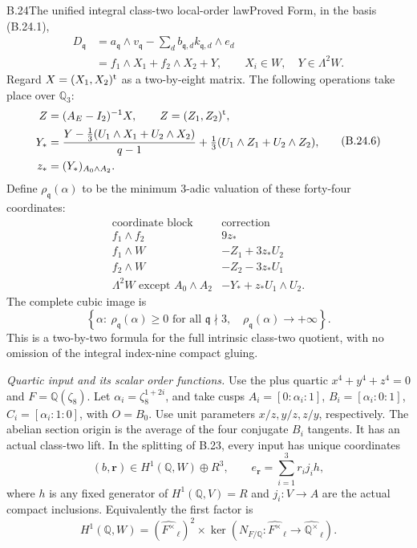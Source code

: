 \begin{statement}{B.24}{The unified integral class-two local-order law}{Proved}
Form, in the basis (B.24.1),
\[
 \begin{split}
 D_{\mathfrak q}
 &=a_{\mathfrak q}\wedge v_{\mathfrak q}
       -\sum_d b_{\mathfrak q,d} k_{\mathfrak q,d}\wedge e_d\\
 &=f_1\wedge X_1+f_2\wedge X_2+Y,
       \qquad X_i\in W,\quad Y\in\Lambda^2W .
 \end{split}                                                    \tag{B.24.5}
\]
Regard $X=(X_1,X_2)^{\rm t}$ as a two-by-eight matrix.
The following operations take place over $\mathbb Q_3$:
\[
 \begin{split}
 Z&=(A_E-I_2)^{-1}X,\qquad Z=(Z_1,Z_2)^{\rm t},\\
 Y_*&=\frac{Y-\tfrac13(U_1\wedge X_1+U_2\wedge X_2)}{q-1}
          +\tfrac13(U_1\wedge Z_1+U_2\wedge Z_2),\\
 z_*&=(Y_*)_{A_0\wedge A_2}.
 \end{split}                                                    \tag{B.24.6}
\]
Define $\rho_{\mathfrak q}(\alpha)$ to be the minimum
$3$-adic valuation of these forty-four coordinates:
\[
 \begin{array}{c|c}
 \text{coordinate block}&\text{correction}\\ \hline
 f_1\wedge f_2&9z_*\\
 f_1\wedge W&-Z_1+3z_*U_2\\
 f_2\wedge W&-Z_2-3z_*U_1\\
 \Lambda^2W\text{ except }A_0\wedge A_2&
                   -Y_*+z_*U_1\wedge U_2 .
 \end{array}                                                    \tag{B.24.7}
\]
The complete cubic image is
\[
 \left\{\alpha:\ 
   \rho_{\mathfrak q}(\alpha)\geq0\text{ for all }\mathfrak q\nmid3,
   \quad \rho_{\mathfrak q}(\alpha)\longrightarrow+\infty\right\}.
                                                               \tag{B.24.8}
\]
This is a two-by-two formula for the full intrinsic
class-two quotient, with no omission of the integral
index-nine compact gluing.

\emph{Quartic input and its scalar order functions.}
Use the plus quartic $x^4+y^4+z^4=0$ and
$F=\mathbb Q(\zeta_8)$. Let $\alpha_i=\zeta_8^{1+2i}$,
and take cusps
$A_i=[0:\alpha_i:1]$, $B_i=[\alpha_i:0:1]$,
$C_i=[\alpha_i:1:0]$, with $O=B_0$.
Use unit parameters $x/z,y/z,z/y$, respectively.
The abelian section origin is the average of the four
conjugate $B_i$ tangents. It has an actual class-two lift.
In the splitting of B.23, every input has unique coordinates
\[
 (b,\mathbf r)\in H^1(\mathbb Q,W)\oplus R^3,\qquad
 e_{\mathbf r}=\sum_{i=1}^3r_i j_i h,
                                                               \tag{B.24.9}
\]
where $h$ is any fixed generator of $H^1(\mathbb Q,V)=R$
and $j_i:V\to A$ are the actual compact inclusions.
Equivalently the first factor is
\[
 H^1(\mathbb Q,W)=
 (\widehat{F^\times}_{\,\ell})^2
 \times\ker\left(N_{F/\mathbb Q}:
      \widehat{F^\times}_{\,\ell}\to
      \widehat{\mathbb Q^\times}_{\,\ell}\right).
                                                               \tag{B.24.10}
\]


\end{statement}
